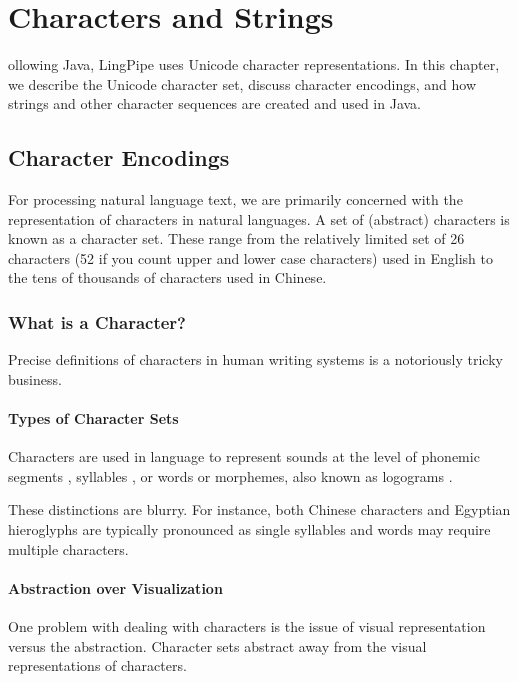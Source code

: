 \chapter{Characters and Strings}\label{chap:char}

ollowing Java, LingPipe uses Unicode character
representations.  In this chapter, we describe the Unicode character
set, discuss character encodings, and how strings and other character
sequences are created and used in Java.


\section{Character Encodings}

For processing natural language text, we are primarily concerned with
the representation of characters in natural languages.  A set of
(abstract) characters is known as a character set.  These range from
the relatively limited set of 26 characters (52 if you count upper and
lower case characters) used in English to the tens of thousands of
characters used in Chinese.


\subsection{What is a Character?}

Precise definitions of characters in human writing systems is a
notoriously tricky business.  

\subsubsection{Types of Character Sets}

Characters are used in language to represent sounds at the level of
phonemic segments , syllables , or words or morphemes, also
known as logograms .  

These distinctions are blurry.  For instance, both Chinese characters
and Egyptian hieroglyphs are typically pronounced as single syllables
and words may require multiple characters.

\subsubsection{Abstraction over Visualization}

One problem with dealing with characters is the issue of visual
representation versus the abstraction.  Character sets abstract away
from the visual representations of characters.  

